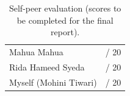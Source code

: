 \documentclass[10pt,twocolumn,letterpaper]{article}
\begin{document}
\begin{table}[h]
  \centering
  \small
  \begin{tabular}{|l|c|}
    \hline
    Mahua Mahua & \underline{\hspace{2em}} / 20 \\
    Rida Hameed Syeda & \underline{\hspace{2em}} / 20 \\
    Myself (Mohini Tiwari) & \underline{\hspace{2em}} / 20 \\
    \hline
  \end{tabular}
  \caption{Self-peer evaluation (scores to be completed for the final report).}
  \label{tab:peer}
\end{table}

{
  \small
  
  
}
\end{document}
